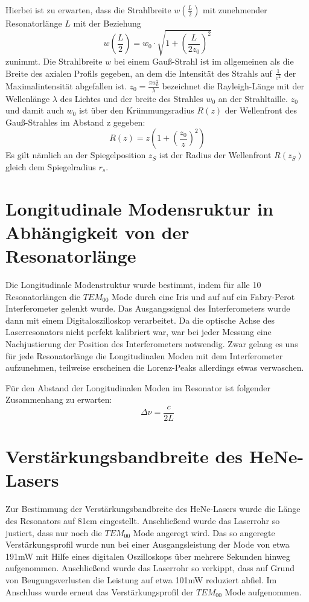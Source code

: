 \documentclass[bigchapter,colorback,accentcolor=tud4b,linedtoc,11pt]{tudreport}
\numberwithin{equation}{subsection}
\begin{document}
Hierbei ist zu erwarten, dass die Strahlbreite $w\left(\frac{L}{2}\right)$ mit zunehmender Resonatorlänge \(L\) mit der Beziehung 
$$w\left(\frac{L}{2}\right)=w_0\cdot\sqrt{1+\left({\frac{L}{2 z_0}}\right)^2}$$
zunimmt. Die Strahlbreite \(w\) bei einem Gauß-Strahl ist im allgemeinen als die Breite des axialen Profils gegeben, an dem die Intensität des Strahls auf $\frac{1}{e^2}$ der Maximalintensität abgefallen ist. \(z_0=\frac{\pi w_0^2}{\lambda}\) bezeichnet die Rayleigh-Länge mit der Wellenlänge \(\lambda\) des Lichtes und der breite des Strahles \(w_0\) an der Strahltaille. \(z_0\) und damit auch \(w_0\) ist über den Krümmungsradius $R(z)$ der Wellenfront des Gauß-Strahles im Abstand z gegeben:
$$R(z) = z \left(1+\left(\frac{z_0}{z}\right)^2\right)$$
Es gilt nämlich an der Spiegelposition \(z_S\) ist der Radius der Wellenfront \(R(z_S)\) gleich dem Spiegelradius \(r_s\).


\FloatBarrier
\section{Longitudinale Modensruktur in Abhängigkeit von der Resonatorlänge}
Die Longitudinale Modenstruktur wurde bestimmt, indem für alle 10 Resonatorlängen die $TEM_{00}$ Mode durch eine Iris und auf auf ein Fabry-Perot Interferometer gelenkt wurde. Das Ausgangssignal des Interferometers wurde dann mit einem Digitaloszilloskop verarbeitet.
Da die optische Achse des Laserresonators nicht perfekt kalibriert war, war bei jeder Messung eine Nachjustierung der Position des Interferometers notwendig. Zwar gelang es uns für jede Resonatorlänge die Longitudinalen Moden mit dem Interferometer aufzunehmen, teilweise erscheinen die Lorenz-Peaks allerdings etwas verwaschen.

Für den Abstand der Longitudinalen Moden im Resonator ist folgender Zusammenhang zu erwarten:
$$\Delta\nu=\frac{c}{2L}$$
\FloatBarrier
\newpage
\section{Verstärkungsbandbreite des HeNe-Lasers}
Zur Bestimmung der Verstärkungsbandbreite des HeNe-Lasers wurde die Länge des Resonators auf 81cm eingestellt. Anschließend wurde das Laserrohr so justiert, dass nur noch die $TEM_{00}$ Mode angeregt wird. Das so angeregte Verstärkungsprofil wurde nun bei einer Ausgangsleistung der Mode von etwa 191mW mit Hilfe eines digitalen Oszilloskops über mehrere Sekunden hinweg aufgenommen. Anschließend wurde das Laserrohr so verkippt, dass auf Grund von Beugungsverlusten die Leistung auf etwa 101mW reduziert abfiel. Im Anschluss wurde erneut das Verstärkungsprofil der $TEM_{00}$ Mode aufgenommen.
\end{document}
